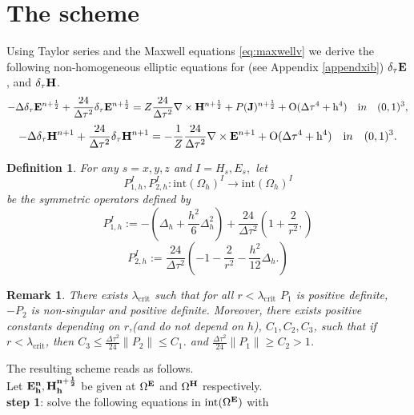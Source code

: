\documentclass[12pt,reqno]{amsart}
\newcommand{\e}{{\bf E}}
\newcommand{\h}{{\bf H}}
\newcommand{\J}{{\bf J}}
\newtheorem{defi}[theorem]{Definition}
\newtheorem{rem}[theorem]{Remark}
\theoremstyle{definition}
\numberwithin{equation}{section}
\newcommand{\intr}[1]{\mathrm{int}(#1)}
\def\Gw{\Omega}     \def\Gx{\Xi}         \def\Gy{\Psi}
\def\Gwh{\Omega_h}
\begin{document}
	\section{The scheme}
	Using  Taylor series and the Maxwell equations \eqref{eq:maxwellv} we derive the following non-homogeneous elliptic equations for (see Appendix \ref{appendxib})
$	\delta_{\tau} \bf{E}$, and $\delta_{\tau} \bf{H}$.
	$$
	-\Delta\delta_{\tau} \e^{n+\frac{1}{2}}+\frac{24}{\Delta \tau^2}\delta_{\tau}\e^{n+\frac{1}{2}}=
	Z\frac{24}{\Delta \tau^2}\nabla\times \h^{n+\frac{1}{2}}+P(\J)^{n+\frac{1}{2}}+
	\mathrm{O(\Delta \tau^4+h^4)} \quad {\mathrm in} \quad (0,1)^3,
	$$
		$$
	-\Delta \delta_{\tau}\h^{n+1}+\frac{24}{\Delta \tau^2}\delta_{\tau}\h^{n+1}=
	-\frac{1}{Z}\frac{24}{\Delta \tau^2}\nabla\times \e^{n+1}+
	\mathrm{O(\Delta \tau^4+h^4)} \quad {\mathrm in} \quad (0,1)^3.
	$$
	\begin{defi}
		For any $s=x,y,z$ and $I= H_s, E_s,$
		let $$P_{1,h}^{I}, P_{2,h}^{I}:\intr\Gwh^{I}\to \intr\Gwh^{I}$$ be the symmetric operators defined by
		$$
		P_{1,h}^{I}:=-\left (\Delta_h+\frac{h^2}{6}\Delta_h^2\right)+\frac{24}{\Delta \tau^2}\left (
		 1+\frac{2}{r^2},
		\right)
		$$
		$$
			P_{2,h}^{I}:=\frac{24}{\Delta \tau^2}\left (
		-1-\frac{2}{r^2}-\frac{h^2}{12}\Delta_h.
		\right)
		$$	
		
		
	\end{defi}
\begin{rem}\label{lem:bottom_spectrum}
	There exists $\lambda_{\mathrm{crit}}$ such that for all $r<\lambda_{\mathrm{crit}}$
 $P_1$ is positive definite, $-P_2$ is non-singular and positive definite.
Moreover, there exists positive  constants depending on $r$,(and  do not depend on $h$), $C_1,C_2, C_3$, such that
if $r<\lambda_{\mathrm{crit}}$, then
$C_3\leq \frac{\Delta \tau^2 }{24}\|P_2\|\leq C_1$.
and 
$\frac{\Delta \tau^2 }{24}\|P_1\|\geq C_2>1$.
\end{rem}
	The resulting scheme reads as follows.\\[1mm]
	Let $\bf{E}^n_h, \bf{H}^{n+\frac{1}{2}}_h$  be given at $\Gw^{\e}$ and $\Gw^{\h}$ respectively. \\[2mm]
	{\bf step 1}: solve the following equations in $\intr{\Gw^{\e}}$ with
\end{document}
